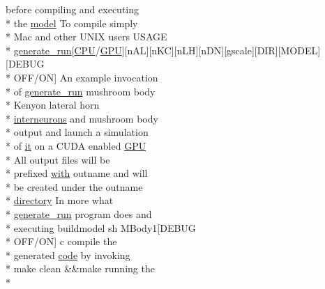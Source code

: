 \begin{DoxyCompactItemize}
before compiling and executing \\*
the \hyperlink{README_8txt_a69fd801b7213948c12d9dd7eebb3ed14}{model} To compile simply \\*
Mac and other U\+N\+I\+X users U\+S\+A\+G\+E \\*
\hyperlink{userproject_2MBody__userdef__project_2README_8txt_a320a215d1e27b4de394be70e90d22863}{generate\+\_\+run}\mbox{[}\hyperlink{README_8txt_a74a069e3c75797de2636c4dd14daa147}{C\+P\+U}/\hyperlink{modelSpec_8h_a39cb9803524b6f3b783344b2f89867b4}{G\+P\+U}\mbox{]}\mbox{[}n\+A\+L\mbox{]}\mbox{[}n\+K\+C\mbox{]}\mbox{[}n\+L\+H\mbox{]}\mbox{[}n\+D\+N\mbox{]}\mbox{[}gscale\mbox{]}\mbox{[}D\+I\+R\mbox{]}\mbox{[}M\+O\+D\+E\+L\mbox{]}\mbox{[}D\+E\+B\+U\+G \\*
O\+F\+F/O\+N\mbox{]} An example invocation \\*
of \hyperlink{userproject_2MBody__userdef__project_2README_8txt_a320a215d1e27b4de394be70e90d22863}{generate\+\_\+run} mushroom body \\*
Kenyon lateral horn \\*
\hyperlink{userproject_2SynDelay__project_2README_8txt_adf6327d22e2c11a62a22ab5afd4f2b81}{interneurons} and mushroom body \\*
output and launch a simulation \\*
of \hyperlink{userproject_2PoissonIzh__project_2README_8txt_a3e3bbb6c9b14c38757cf273a117e43e8}{it} on a C\+U\+D\+A enabled \hyperlink{modelSpec_8h_a39cb9803524b6f3b783344b2f89867b4}{G\+P\+U} \\*
All output files will be \\*
prefixed \hyperlink{userproject_2OneComp__project_2README_8txt_ace09bb40fbf4457ad9a9340a67a4fa9a}{with} outname and will \\*
be created under the outname \\*
\hyperlink{README_8txt_ae619b68020535fba5ac79522a0d9d1c4}{directory} In more what \\*
\hyperlink{userproject_2MBody__userdef__project_2README_8txt_a320a215d1e27b4de394be70e90d22863}{generate\+\_\+run} program does and \\*
executing buildmodel sh M\+Body1\mbox{[}D\+E\+B\+U\+G \\*
O\+F\+F/O\+N\mbox{]} c compile the \\*
generated \hyperlink{userproject_2MBody__userdef__project_2README_8txt_aeec4e596748e7c29dd5548dae4c70685}{code} by invoking \\*
make clean \&\&make running the \\*

\end{DoxyCompactItemize}
